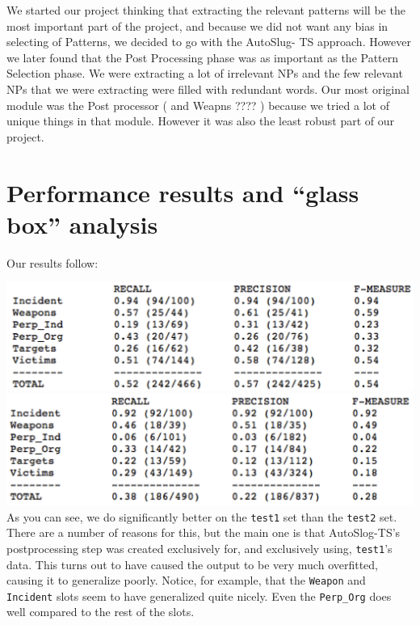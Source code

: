 \documentclass[11pt]{myclass}
\begin{document}
We started our project thinking that extracting the relevant patterns will be the most important part of the project, and because we did not want any bias in selecting of Patterns, we decided to go with the AutoSlug- TS approach. However we later found that the Post Processing phase was as important as the Pattern Selection phase. We were extracting a lot of irrelevant NPs and the few relevant NPs that we were extracting were filled with redundant words. Our most original module was the Post processor ( and Weapns ???? ) because we tried a lot of unique things in that module. However it was also the least robust part of our project.

\section{Performance results and “glass box” analysis}

Our results follow:

\includegraphics[scale=0.75]{result_t1.png} \\
\includegraphics[scale=0.75]{result_t2.png} \\

As you can see, we do significantly better on the \texttt{test1} set than the \texttt{test2} set. There are a number of reasons for this, but the main one is that AutoSlog-TS's postprocessing step was created exclusively for, and exclusively using, \texttt{test1}'s data. This turns out to have caused the output to be very much overfitted, causing it to generalize poorly. Notice, for example, that the \texttt{Weapon} and \texttt{Incident} slots seem to have generalized quite nicely. Even the \texttt{Perp\_Org} does well compared to the rest of the slots.
\end{document}
